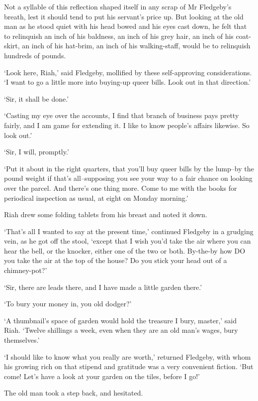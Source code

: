 Not a syllable of this reflection shaped itself in any scrap of Mr
Fledgeby’s breath, lest it should tend to put his servant’s price up.
But looking at the old man as he stood quiet with his head bowed and his
eyes cast down, he felt that to relinquish an inch of his baldness,
an inch of his grey hair, an inch of his coat-skirt, an inch of his
hat-brim, an inch of his walking-staff, would be to relinquish hundreds
of pounds.

‘Look here, Riah,’ said Fledgeby, mollified by these self-approving
considerations. ‘I want to go a little more into buying-up queer bills.
Look out in that direction.’

‘Sir, it shall be done.’

‘Casting my eye over the accounts, I find that branch of business pays
pretty fairly, and I am game for extending it. I like to know people’s
affairs likewise. So look out.’

‘Sir, I will, promptly.’

‘Put it about in the right quarters, that you’ll buy queer bills by the
lump--by the pound weight if that’s all--supposing you see your way to a
fair chance on looking over the parcel. And there’s one thing more. Come
to me with the books for periodical inspection as usual, at eight on
Monday morning.’

Riah drew some folding tablets from his breast and noted it down.

‘That’s all I wanted to say at the present time,’ continued Fledgeby in
a grudging vein, as he got off the stool, ‘except that I wish you’d take
the air where you can hear the bell, or the knocker, either one of the
two or both. By-the-by how DO you take the air at the top of the house?
Do you stick your head out of a chimney-pot?’

‘Sir, there are leads there, and I have made a little garden there.’

‘To bury your money in, you old dodger?’

‘A thumbnail’s space of garden would hold the treasure I bury, master,’
said Riah. ‘Twelve shillings a week, even when they are an old man’s
wages, bury themselves.’

‘I should like to know what you really are worth,’ returned Fledgeby,
with whom his growing rich on that stipend and gratitude was a very
convenient fiction. ‘But come! Let’s have a look at your garden on the
tiles, before I go!’

The old man took a step back, and hesitated.

